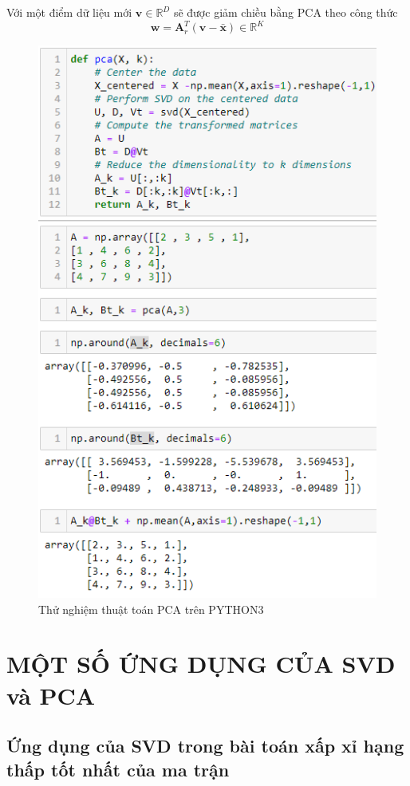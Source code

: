 \documentclass[12pt,a4paper,oneside]{report}
\numberwithin{equation}{section}
\def\R{\mathbb{R}}
\begin{document}
Với một điểm dữ liệu mới $\mathbf{v} \in \R^D$ sẽ
được giảm chiều bằng PCA theo công thức 
\begin{equation} \label{chieu}
	\mathbf{w} = \mathbf{A}_r^T(\mathbf{v} - \bar{\mathbf{x}}) \in
	\R^K
\end{equation} 
\begin{figure}[htp]
	\centering
	\includegraphics[scale=0.9]{implement_pca.png}
	\caption{Thử nghiệm thuật toán PCA trên PYTHON3}
	\label{fig:pca_example}
\end{figure}
\chapter{ MỘT SỐ ỨNG DỤNG CỦA SVD và PCA }

\section{Ứng dụng của SVD trong bài toán xấp xỉ hạng thấp tốt nhất của ma trận}
\end{document}
